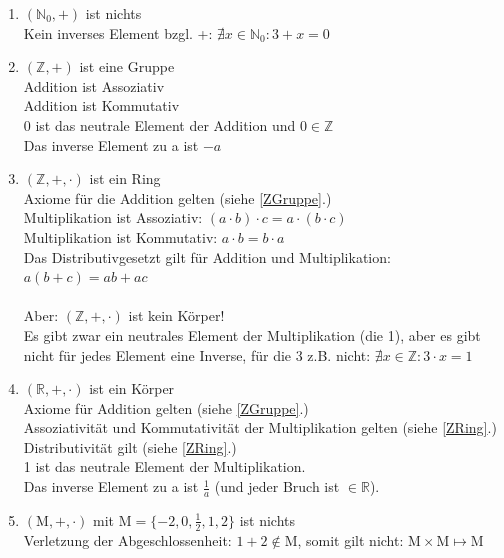 \documentclass[11pt, a4paper]{article}
\begin{document}
\begin{enumerate}
	\item $\left( \mathbb{N}_0, + \right)$ ist nichts \\
		Kein inverses Element bzgl. +: $\nexists x \in \mathbb{N}_0: 3+x=0$
	\item $\left( \mathbb{Z}, + \right)$ ist eine Gruppe \label{ZGruppe} \\
		Addition ist Assoziativ \\
		Addition ist Kommutativ \\
		0 ist das neutrale Element der Addition und $0 \in \mathbb{Z}$ \\
		Das inverse Element zu a ist $-a$
	\item $\left( \mathbb{Z}, +, \cdot \right)$ ist ein Ring \label{ZRing} \\
		Axiome für die Addition gelten (siehe \ref{ZGruppe}.) \\
		Multiplikation ist Assoziativ: $(a \cdot b) \cdot c = a \cdot (b \cdot c)$ \\
		Multiplikation ist Kommutativ: $a \cdot b = b \cdot a$ \\
		Das Distributivgesetzt gilt für Addition und Multiplikation: $a(b+c) = ab + ac$ \\ \\
		Aber: $\left( \mathbb{Z}, +, \cdot \right)$ ist kein Körper! \\
		Es gibt zwar ein neutrales Element der Multiplikation (die 1), aber es gibt nicht für jedes Element eine Inverse, für die 3 z.B. nicht: $\nexists x \in \mathbb{Z}: 3\cdot x = 1$
	\item $\left( \mathbb{R}, +, \cdot \right)$ ist ein Körper \\
		Axiome für Addition gelten (siehe \ref{ZGruppe}.) \\
		Assoziativität und Kommutativität der Multiplikation gelten (siehe \ref{ZRing}.) \\
		Distributivität gilt (siehe \ref{ZRing}.) \\
		1 ist das neutrale Element der Multiplikation. \\
		Das inverse Element zu a ist $\frac{1}{a}$ (und jeder Bruch ist $\in \mathbb{R}$).
	\item $\left( \mathrm{M}, +, \cdot \right)$ mit $\mathrm{M} = \{ -2,0,\frac{1
	}{2},1,2 \}$ ist nichts \\
		Verletzung der Abgeschlossenheit: $1+2 \notin \mathrm{M}$, somit gilt nicht: $\mathrm{M} \times \mathrm{M} \mapsto \mathrm{M}$ \\

\end{enumerate}
\end{document}
